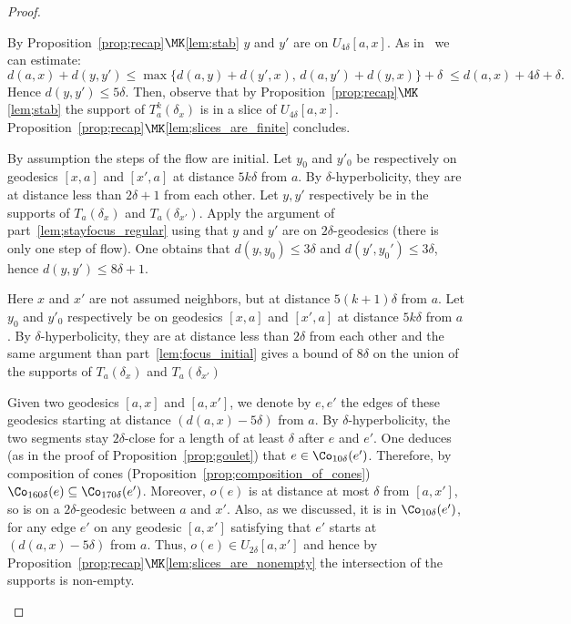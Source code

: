 \begin{proof}
\begin{step}[\eqref{lem;stayfocus_regular}]
By Proposition~\ref{prop;recap}$\MK$\eqref{lem;stab} $y$ and $y'$ are on $U_{4\delta}[a,x]$. As in~\cite{AL} we can estimate:
\[
d(a,x) + d(y,y') \leq \max \{ d(a,y) + d(y',x),
\, d(a,y') + d(y,x) \} +\delta \; \leq d(a,x) + 4\delta +\delta.
\]
Hence $d(y,y') \leq 5\delta$. Then, observe that by Proposition~\ref{prop;recap}$\MK$\eqref{lem;stab} the support of $T^k_a(\delta_x)$ is in a slice of $U_{4\delta} [a,x]$. Proposition~\ref{prop;recap}$\MK$\eqref{lem;slices_are_finite} concludes.
\end{step}

\begin{step}[\eqref{lem;focus_initial}]
By assumption the steps of the flow are initial. Let $y_0$ and $y'_0$ be respectively on geodesics $[x,a]$ and $[x',a]$ at distance $5k\delta$ from $a$. By $\delta$-hyperbolicity, they are at distance less than $2\delta+1$ from each other. Let $y, y'$ respectively be in the supports of $T_a(\delta_x)$ and $T_a(\delta_{x'})$. Apply the argument of part~\eqref{lem;stayfocus_regular} using that $y$ and $y'$ are on $2\delta$-geodesics (there is only one step of flow). One obtains that $d(y,y_0) \leq 3\delta$ and $d(y', y_0') \leq 3\delta$, hence $d(y,y')\leq 8\delta+1$.
\end{step}

\begin{step}[\eqref{lem;elementary_confluence}]
Here $x$ and $x'$ are not assumed neighbors, but at distance $5(k+1)\delta$ from $a$. Let $y_0$ and $y'_0$ respectively be on geodesics $[x,a]$ and $[x',a]$ at distance $5k\delta$ from $a$. By $\delta$-hyperbolicity, they are at distance less than $2\delta$ from each other and the same argument than part~\eqref{lem;focus_initial} gives a bound of $8\delta$ on the union of the supports of $T_a(\delta_x)$ and $T_a(\delta_{x'})$

Given two geodesics $[a,x]$ and $[a,x']$, we denote by $e, e'$ the edges of these geodesics starting at distance $\left(d(a,x) -5\delta\right)$ from $a$. By $\delta$-hyperbolicity, the two segments stay $2\delta$-close for a length of at least $\delta$ after $e$ and $e'$. One deduces (as in the proof of Proposition~\ref{prop;goulet}) that $e\in \Co_{10\delta}(e')$. Therefore, by composition of cones (Proposition~\ref{prop;composition_of_cones}) $\Co_{160\delta}(e) \subseteq \Co_{170\delta} (e')$. Moreover, $o(e)$ is at distance at most $\delta$ from $[a,x']$, so is on a $2\delta$-geodesic between $a$ and $x'$. Also, as we discussed, it is in $\Co_{10\delta}(e')$, for any edge $e'$ on any geodesic $[a,x']$ satisfying that $e'$ starts at $\left(d(a,x) -5\delta\right)$ from $a$. Thus, $o(e) \in U_{2\delta}[a,x']$ and hence by Proposition~\ref{prop;recap}$\MK$\eqref{lem;slices_are_nonempty} the intersection of the supports is non-empty.
\end{step}


\end{proof}
